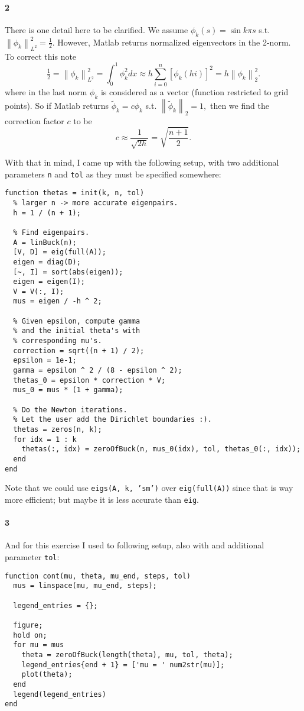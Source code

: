 \documentclass[a4paper]{article}
\newcommand{\norm}[1]{\left\lVert#1\right\rVert}
\begin{document}
  \paragraph{2} There is one detail here to be clarified. We assume $\phi_k(s) = \sin k\pi s$ s.t. $\norm{\phi_k}^2_{L^2} = \tfrac{1}{2}.$ However, Matlab returns normalized eigenvectors in the 2-norm. To correct this note
  \begin{equation}
    \tfrac{1}{2} = \norm{\phi_k}^2_{L^2} = \int_0^1 \phi_k^2 dx \approx h \sum_{i = 0}^n \left[\phi_k(hi)\right]^2 = h \norm{\phi_k}^2_2.
  \end{equation}
  where in the last norm $\phi_k$ is considered as a vector (function restricted to grid points). So if Matlab returns $\tilde{\phi}_k = c \phi_k$ s.t. $\norm{\tilde{\phi}_k}_2 = 1,$ then we find the correction factor $c$ to be $$c \approx \frac{1}{\sqrt{2h}} = \sqrt{\frac{n+1}{2}}.$$

  With that in mind, I came up with the following setup, with two additional parameters {\tt n} and {\tt tol} as they must be specified somewhere:
  \begin{lstlisting}
function thetas = init(k, n, tol)
  % larger n -> more accurate eigenpairs.
  h = 1 / (n + 1);

  % Find eigenpairs.
  A = linBuck(n);
  [V, D] = eig(full(A));
  eigen = diag(D);
  [~, I] = sort(abs(eigen));
  eigen = eigen(I);
  V = V(:, I);
  mus = eigen / -h ^ 2;

  % Given epsilon, compute gamma
  % and the initial theta's with
  % corresponding mu's.
  correction = sqrt((n + 1) / 2);
  epsilon = 1e-1;
  gamma = epsilon ^ 2 / (8 - epsilon ^ 2);
  thetas_0 = epsilon * correction * V;
  mus_0 = mus * (1 + gamma);

  % Do the Newton iterations.
  % Let the user add the Dirichlet boundaries :).
  thetas = zeros(n, k);
  for idx = 1 : k
    thetas(:, idx) = zeroOfBuck(n, mus_0(idx), tol, thetas_0(:, idx));
  end
end
  \end{lstlisting}
  Note that we could use {\tt eigs(A, k, 'sm')} over {\tt eig(full(A))} since that is way more efficient; but maybe it is less accurate than {\tt eig}.
  \newpage
  \paragraph{3} And for this exercise I used to following setup, also with and additional parameter {\tt tol}:
  \begin{lstlisting}
function cont(mu, theta, mu_end, steps, tol)
  mus = linspace(mu, mu_end, steps);

  legend_entries = {};
  
  figure;
  hold on;
  for mu = mus
    theta = zeroOfBuck(length(theta), mu, tol, theta);
    legend_entries{end + 1} = ['mu = ' num2str(mu)];
    plot(theta);
  end
  legend(legend_entries)
end
  \end{lstlisting}
\end{document}
